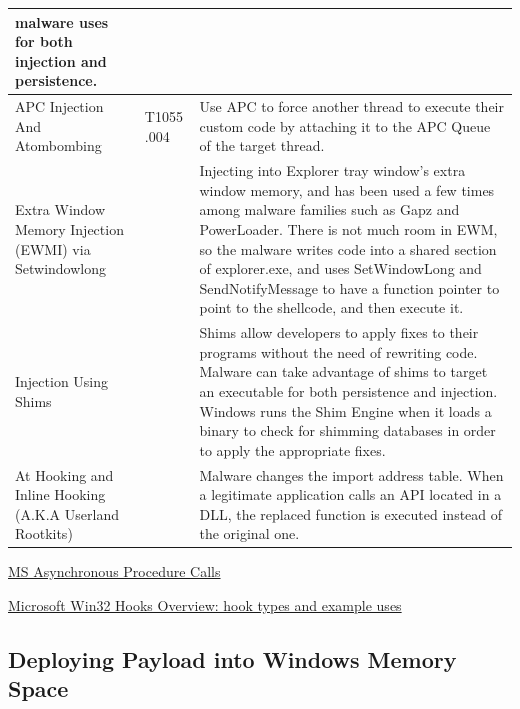 \documentclass{article}
\begin{document}
\begin{table}[h!]
\begin{tabular}{ |p{3.5cm}||p{1.2cm}|p{10cm}|  }
               malware uses for both injection and persistence. \\
  \hline
  APC Injection And Atombombing
        & T1055 .004
             & Use APC to force another thread to execute their custom code by attaching it to the APC
               Queue of the target thread. \\
  \hline
  Extra Window Memory Injection (EWMI) via Setwindowlong
        &
             & Injecting into Explorer tray window’s extra window memory, and has been used a few times
               among malware families such as Gapz and PowerLoader. There is not much room in EWM, so the
               malware writes code into a shared section of explorer.exe, and uses SetWindowLong and
               SendNotifyMessage to have a function pointer to point to the shellcode, and then execute it. \\
  \hline
  Injection Using Shims
        &
             & Shims allow developers to apply fixes to their programs without the need of rewriting code.
               Malware can take advantage of shims to target an executable for both persistence and injection.
               Windows runs the Shim Engine when it loads a binary to check for shimming databases in order
              to apply the appropriate fixes. \\
  \hline
  At Hooking and Inline Hooking (A.K.A Userland Rootkits)
        &
            & Malware changes the import address table. When a legitimate application calls an API located
              in a DLL, the replaced function is executed instead of the original one. \\

  \hline
\end{tabular}
\label{table: ProcessInjectionTechniques}
\end{table}

\pagebreak

\href{https://learn.microsoft.com/en-gb/windows/win32/sync/asynchronous-procedure-calls}{MS Asynchronous Procedure Calls}

\href{https://learn.microsoft.com/en-gb/windows/win32/winmsg/about-hooks}{Microsoft Win32 Hooks Overview: hook types and example uses}

\subsection{Deploying Payload into Windows Memory Space}

\subsubsection{}
\textcite{Zhan:2018}
\end{document}
